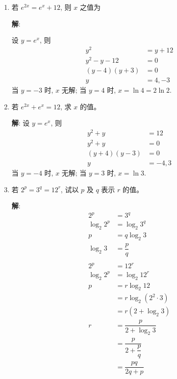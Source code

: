 \documentclass{report}
\newcommand{\sol}{\vspace{0.2cm}\textbf{解}:}
\begin{document}
\begin{multicols*}{2}
\begin{enumerate}
        \item 若 $e^{2 x}=e^x+12$, 则 $x$ 之值为

              \sol{}

              设 $y = e^x$, 则
              \begin{align*}
                  y^2            & = y + 12 \\
                  y^2 - y - 12   & = 0      \\
                  (y - 4)(y + 3) & = 0      \\
                  y              & = 4, -3
              \end{align*}
              当 $y = -3$ 时, $x$ 无解; 当 $y = 4$ 时, $x = \ln 4 = 2\ln 2$.

        \item 若 $e^{2 x}+e^x=12$, 求 $x$ 的值。

              \sol{}
              设 $y = e^x$, 则
              \begin{align*}
                  y^2 + y        & = 12    \\
                  y^2 + y        & = 0     \\
                  (y + 4)(y - 3) & = 0     \\
                  y              & = -4, 3
              \end{align*}
              当 $y = -4$ 时, $x$ 无解; 当 $y = 3$ 时, $x = \ln 3$.

        \item 若 $2^p=3^q=12^r$, 试以 $p$ 及 $q$ 表示 $r$ 的值。

              \sol{}
              \begin{align*}
                  2^p        & = 3^q                         \\
                  \log_2 2^p & = \log_2 3^q                  \\
                  p          & = q \log_2 3                  \\
                  \log_2 3   & = \dfrac{p}{q}                \\
                  \\
                  2^p        & = 12^r                        \\
                  \log_2 2^p & = \log_2 12^r                 \\
                  p          & = r \log_2 12                 \\
                             & = r \log_2 (2^2 \cdot 3)      \\
                             & = r (2 + \log_2 3)            \\
                  r          & = \dfrac{p}{2 + \log_2 3}     \\
                             & = \dfrac{p}{2 + \dfrac{p}{q}} \\
                             & = \dfrac{pq}{2q + p}
              \end{align*}


\end{enumerate}
\end{multicols*}
\end{document}
